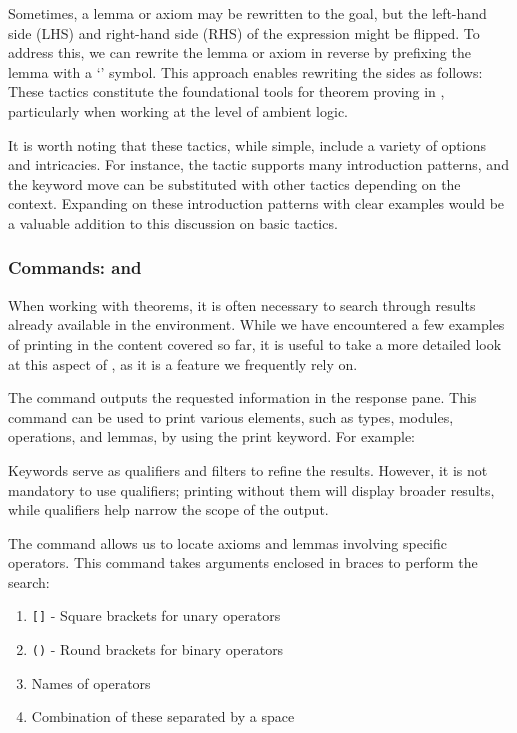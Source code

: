 Sometimes, a lemma or axiom may be rewritten to the goal, but the left-hand side (LHS) and right-hand side (RHS) of the expression might be flipped. To address this, we can rewrite the lemma or axiom in reverse by prefixing the lemma with a `\ecinline{-}' symbol. This approach enables rewriting the sides as follows:\\
These tactics constitute the foundational tools for theorem proving in \EasyCrypt, particularly when working at the level of ambient logic.

It is worth noting that these tactics, while simple, include a variety of options and intricacies. For instance, the  tactic supports many introduction patterns, and the keyword move can be substituted with other tactics depending on the context. Expanding on these introduction patterns with clear examples would be a valuable addition to this discussion on basic tactics.
\newpage
\subsubsection{Commands:  and }
When working with theorems, it is often necessary to search through results already available in the environment. While we have encountered a few examples of printing in the content covered so far, it is useful to take a more detailed look at this aspect of \EasyCrypt, as it is a feature we frequently rely on.

The  command outputs the requested information in the response pane. This command can be used to print various elements, such as types, modules, operations, and lemmas, by using the print keyword. For example:\\

Keywords serve as qualifiers and filters to refine the results. However, it is not mandatory to use qualifiers; printing without them will display broader results, while qualifiers help narrow the scope of the output.

The  command allows us to locate axioms and lemmas involving specific operators. This command takes arguments enclosed in braces to perform the search:
\begin{enumerate}
	\item \texttt{[]} - Square brackets for unary operators
	\item \texttt{()} - Round brackets for binary operators
	\item Names of operators
	\item Combination of these separated by a space
\end{enumerate}

